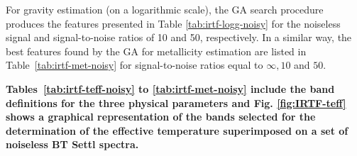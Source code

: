 For gravity estimation (on a logarithmic scale), the GA search
procedure produces the features presented in
Table %
\ref{tab:irtf-logg-noisy} for
the noiseless signal and signal-to-noise ratios of 10 and 50,
respectively. In a similar way, the best features found 
by the GA for metallicity estimation are listed in %
Table~\ref{tab:irtf-met-noisy} for signal-to-noise
ratios equal to $ \infty, 10 $ and $ 50 $.

{\bf Tables~\ref{tab:irtf-teff-noisy} to \ref{tab:irtf-met-noisy}
include the band definitions for the three physical parameters and
Fig. \ref{fig:IRTF-teff} shows a graphical representation of the bands
selected for the determination of the effective temperature
superimposed on a set of noiseless BT Settl spectra.}

